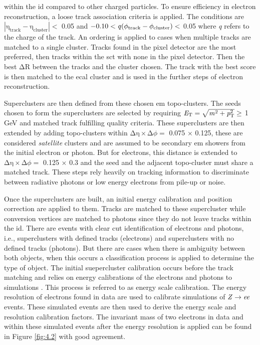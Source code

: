 within the \gls{id} compared to other charged particles. To ensure efficiency in electron reconstruction, a loose track association criteria is applied. The conditions are 
$|\textrm{η}_{\textrm{track}} - \textrm{η}_{\textrm{cluster}}| <$ 0.05 and $-\textrm{0.10} < \textrm{\textit{q}}(\phi_{\textrm{track}} - \phi_{\textrm{cluster}}) <$ 0.05 where 
\textit{q} refers to the charge of the track. An ordering is applied to cases when multiple tracks are matched to a single cluster. Tracks found in the pixel detector are the most 
preferred, then tracks within the \gls{sct} with none in the pixel detector. Then the best $∆\mathrm{\textrm{R}}$ between the tracks and the cluster chosen. The track with the best score 
is then matched to the \gls{ecal} cluster and is used in the further steps of electron reconstruction.
\par
Superclusters are then defined from these chosen \gls{em} topo-clusters. The seeds chosen to form the superclusters are selected by requiring 
$\textit{E}_{\textrm{T}} = \sqrt{\textrm{\textit{m}}^{\textrm{2}}+\textit{\textit{p}}_{\textrm{T}}^{\textrm{2}}} \ge$ 1 GeV and matched track fulfilling quality criteria.
These superclusters are then extended by adding topo-clusters within $∆\textrm{η} \times ∆\phi =$ 0.075 $\times$ 0.125, these are considered \textit{satellite} clusters 
and are assumed to be secondary \gls{em} showers from the initial electron or photon. But for electrons, this distance is extended to $∆\textrm{η} \times ∆\phi =$ 0.125 $\times$ 0.3
 and the seed and the adjacent topo-cluster must share a matched track. These steps rely heavily on tracking information to discriminate between radiative photons or low energy 
 electrons from pile-up or noise. 
 \par
Once the superclusters are built, an initial energy calibration and position correction are applied to them. Tracks are matched to these supercluster while conversion vertices 
are matched to photons since they do not leave tracks within the \gls{id}. There are events with clear cut identification of electrons and photons, i.e., superclusters with 
defined tracks (electrons) and superclusters with no defined tracks (photons). But there are cases when there is ambiguity between both objects, when this occurs a classification 
process is applied to determine the type of object. The initial suepercluster calibration occurs before the track matching and relies on energy calibrations of the
electrons and photons to simulations \cite{ele-cali}. This process is referred to as energy scale calibration. The energy resolution of electrons found in data are used 
to calibrate simulations of $\textrm{\textit{Z}} \rightarrow \textrm{\textit{ee}}$ events. These simulated events are then used to derive the energy scale and resolution calibration 
factors. The invariant mass of two electrons in data and within these simulated events after the energy resolution is applied can be found in Figure \ref{fig:4.2} with good agreement.

